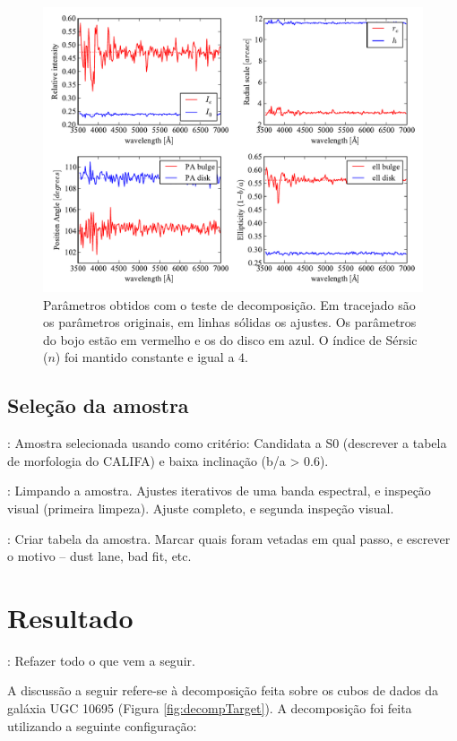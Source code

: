 \begin{figure}
	\includegraphics[width=1.0\columnwidth]{figuras/test-parameters}
	\caption[Parâmetros obtidos com o teste de decomposição] {Parâmetros obtidos
	com o teste de decomposição. Em tracejado são os parâmetros originais, em
	linhas sólidas os ajustes. Os parâmetros do bojo estão em vermelho e os do
	disco em azul. O índice de Sérsic ($n$) foi mantido constante e igual a $4$.}
	\label{fig:testParameters}
\end{figure}

\subsection{Seleção da amostra}

\TODO: Amostra selecionada usando como critério: Candidata a S0 (descrever a
tabela de morfologia do CALIFA) e baixa inclinação (b/a > 0.6).

\TODO: Limpando a amostra. Ajustes iterativos de uma banda espectral, e inspeção
visual (primeira limpeza). Ajuste completo, e segunda inspeção visual.

\TODO: Criar tabela da amostra. Marcar quais foram vetadas em qual passo, e
escrever o motivo -- dust lane, bad fit, etc.

\section{Resultado}

\TODO: Refazer todo o que vem a seguir.

A discussão a seguir refere-se à decomposição feita sobre os cubos de dados da
galáxia UGC 10695 (Figura \ref{fig:decompTarget}). A decomposição foi feita
utilizando a seguinte configuração:

